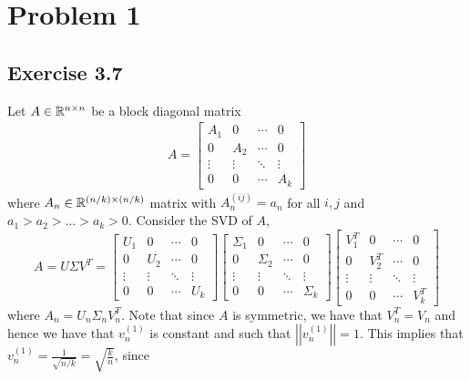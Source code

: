 \documentclass[12pt]{report}
\newcommand{\norm}[1]{\left|\left|#1\right|\right|}
\begin{document}
\maketitle
\section*{Problem 1}
\subsection*{Exercise 3.7}
Let $A \in \mathbb{R}^{n \times n}$ be a block diagonal matrix
\begin{align*}
    A = \begin{bmatrix}
    A_1 & 0 & \cdots & 0 \\
    0 & A_2 & \cdots & 0 \\
    \vdots & \vdots & \ddots & \vdots \\
    0 & 0 & \cdots & A_k
    \end{bmatrix}
\end{align*}
where $A_n \in \mathbb{R}^{(n/k) \times (n/k)}$ matrix with $A_n^{(ij)} = a_n$ for all $i,j$ and $a_1 > a_2 > \dots > a_k > 0$. Consider the SVD of $A$,
\begin{equation*}
  A = U \Sigma V^T = \begin{bmatrix}
    U_1 & 0 & \cdots & 0 \\
    0 & U_2 & \cdots & 0 \\
    \vdots & \vdots & \ddots & \vdots \\
    0 & 0 & \cdots & U_k
  \end{bmatrix}
  \begin{bmatrix}
    \Sigma_1 & 0 & \cdots & 0 \\
    0 & \Sigma_2 & \cdots & 0 \\
    \vdots & \vdots & \ddots & \vdots \\
    0 & 0 & \cdots & \Sigma_k
  \end{bmatrix}
  \begin{bmatrix}
    V_1^T & 0 & \cdots & 0 \\
    0 & V_2^T & \cdots & 0 \\
    \vdots & \vdots & \ddots & \vdots \\
    0 & 0 & \cdots & V_k^T
  \end{bmatrix}
\end{equation*}
where $A_n = U_n \Sigma_n V_n^T$. Note that since $A$ is symmetric, we have that $V_n^T = V_n$ and hence we have that $v_n^{(1)}$ is constant and such that $\norm{v_n^{(1)}} = 1$. This implies that $v_n^{(1)} = \frac{1}{\sqrt{n/k}} = \sqrt{\frac{k}{n}}$, since 
\end{document}

